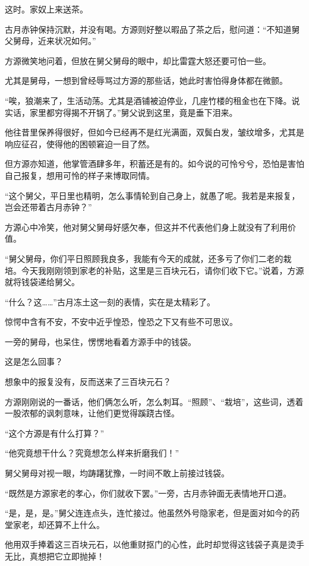 \begin{this_body}
这时。家奴上来送茶。

古月赤钟保持沉默，并没有喝。方源则好整以暇品了茶之后，慰问道：“不知道舅父舅母，近来状况如何。”

方源微笑地问着，但放在舅父舅母的眼中，却比雷霆大怒还要可怕一些。

尤其是舅母，一想到曾经辱骂过方源的那些话，她此时害怕得身体都在微颤。

“唉，狼潮来了，生活动荡。尤其是酒铺被迫停业，几座竹楼的租金也在下降。说实话，家里都穷得揭不开锅了。”舅父说到这里，竟是垂下泪来。

他往昔里保养得很好，但如今已经再不是红光满面，双鬓白发，皱纹增多，尤其是响应征召，使得他的困顿窘迫一目了然。

但方源亦知道，他掌管酒肆多年，积蓄还是有的。如今说的可怜兮兮，恐怕是害怕自己报复，想用可怜的样子来博取同情。

“这个舅父，平日里也精明，怎么事情轮到自己身上，就愚了呢。我若是来报复，岂会还带着古月赤钟？”

方源心中冷笑，他对舅父舅母好感欠奉，但这并不代表他们身上就没有了利用价值。

“舅父舅母，你们平日照顾我良多，我能有今天的成就，还多亏了你们二老的栽培。今天我刚刚领到家老的补贴，这里是三百块元石，请你们收下它。”说着，方源就将钱袋递给舅父。

“什么？这……”古月冻土这一刻的表情，实在是太精彩了。

惊愕中含有不安，不安中近乎惶恐，惶恐之下又有些不可思议。

一旁的舅母，也呆住，愣愣地看着方源手中的钱袋。

这是怎么回事？

想象中的报复没有，反而送来了三百块元石？

方源刚刚说的一番话，他们俩怎么听，怎么刺耳。“照顾”、“栽培”，这些词，透着一股浓郁的讽刺意味，让他们更觉得蹊跷古怪。

“这个方源是有什么打算？”

“他究竟想干什么？究竟想怎么样来折磨我们！”

舅父舅母对视一眼，均踌躇犹豫，一时间不敢上前接过钱袋。

“既然是方源家老的孝心，你们就收下罢。”一旁，古月赤钟面无表情地开口道。

“是，是，是。”舅父连连点头，连忙接过。他虽然外号隐家老，但是面对如今的药堂家老，却还算不上什么。

他用双手捧着这三百块元石，以他重财抠门的心性，此时却觉得这钱袋子真是烫手无比，真想把它立即抛掉！


\end{this_body}
